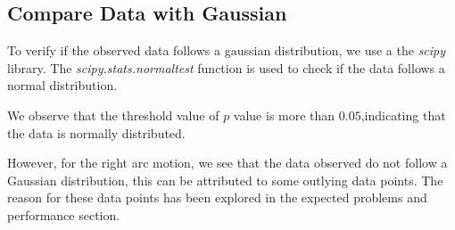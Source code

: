 \documentclass[10pt,a4paper]{article}
\begin{document}
				\subsection{Compare Data with Gaussian}
				To verify if the observed data follows a gaussian distribution, we use a the \textit{scipy} library. The \textit{scipy.stats.normaltest} function is used to check if the data follows a normal distribution. 
				
				We observe that the threshold value of $p$ value is more than $0.05$,indicating that the data is normally distributed.
				
				However, for the right arc motion, we see that the data observed do not follow a Gaussian distribution, this can be attributed to some outlying data points. The reason for these data points has been explored in the expected problems and performance section.
				
\end{document}

